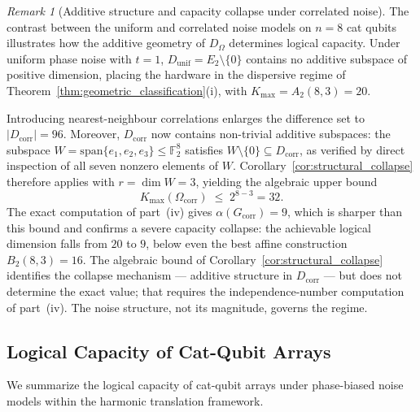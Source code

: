 \documentclass[a4paper,twocolumn,11pt,allowtoday]{quantumarticle}
\theoremstyle{plain}
\theoremstyle{definition}
\theoremstyle{remark}
\newtheorem{remark}[theorem]{Remark}
\begin{document}
\begin{remark}[Additive structure and capacity collapse under correlated noise]
\label{rem:regime_transition}
The contrast between the uniform and correlated noise models on
$n = 8$ cat qubits illustrates how the additive geometry of
$D_{\Omega}$ determines logical capacity.
Under uniform phase noise with $t = 1$,
$D_{\mathrm{unif}} = E_2 \setminus \{0\}$ contains no additive
subspace of positive dimension, placing the hardware in the
dispersive regime of Theorem~\ref{thm:geometric_classification}\textup{(i)},
with $K_{\max} = A_2(8,3) = 20$.

Introducing nearest-neighbour correlations enlarges the difference
set to $|D_{\mathrm{corr}}| = 96$.
Moreover, $D_{\mathrm{corr}}$ now contains non-trivial additive
subspaces: the subspace
$W = \mathrm{span}\{e_1, e_2, e_3\} \leq \mathbb{F}_2^8$
satisfies $W \setminus \{0\} \subseteq D_{\mathrm{corr}}$,
as verified by direct inspection of all seven nonzero elements
of $W$.
Corollary~\ref{cor:structural_collapse} therefore applies with
$r = \dim W = 3$, yielding the algebraic upper bound
\[
  K_{\max}(\Omega_{\mathrm{corr}}) \;\le\; 2^{8-3} = 32.
\]
The exact computation of part~\textup{(iv)} gives
$\alpha(G_{\mathrm{corr}}) = 9$, which is sharper than this bound
and confirms a severe capacity collapse: the achievable logical
dimension falls from $20$ to $9$, below even the best affine
construction $B_2(8,3) = 16$.
The algebraic bound of Corollary~\ref{cor:structural_collapse}
identifies the collapse mechanism --- additive structure in
$D_{\mathrm{corr}}$ --- but does not determine the exact value;
that requires the independence-number computation of
part~\textup{(iv)}.
The noise structure, not its magnitude, governs the regime.
\end{remark}



\subsection{Logical Capacity of Cat-Qubit Arrays}
\label{subsec:catqubit_main}

We summarize the logical capacity of cat-qubit arrays under
phase-biased noise models within the harmonic translation framework.
\end{document}
